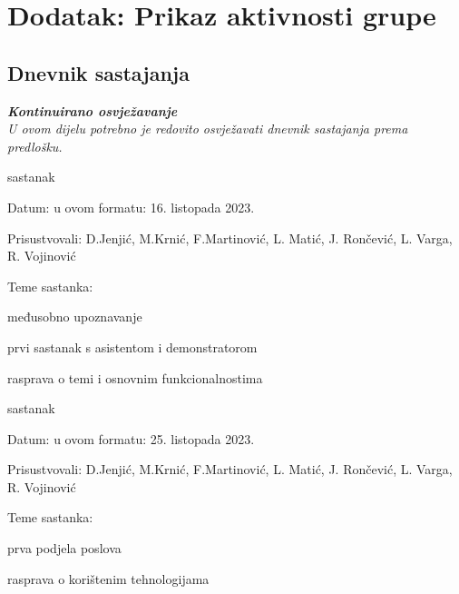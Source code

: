 \chapter*{Dodatak: Prikaz aktivnosti grupe}
		
		\section*{Dnevnik sastajanja}
		
		\textbf{\textit{Kontinuirano osvježavanje}}\\
		
		 \textit{U ovom dijelu potrebno je redovito osvježavati dnevnik sastajanja prema predlošku.}
		
		\begin{packed_enum}
			\item  sastanak
			
			\item[] \begin{packed_item}
				\item Datum: u ovom formatu: 16. listopada 2023.
				\item Prisustvovali: D.Jenjić, M.Krnić, F.Martinović, L. Matić, J. Rončević, L. Varga, R. Vojinović
				\item Teme sastanka:
				\begin{packed_item}
					\item  međusobno upoznavanje
					\item  prvi sastanak s asistentom i demonstratorom
					\item  rasprava o temi i osnovnim funkcionalnostima 
				\end{packed_item}
			\end{packed_item}
		
			
			\item  sastanak
			\item[] \begin{packed_item}
				\item Datum: u ovom formatu: 25. listopada 2023.
				\item Prisustvovali:  D.Jenjić, M.Krnić, F.Martinović, L. Matić, J. Rončević, L. Varga, R. Vojinović
				\item Teme sastanka:
				\begin{packed_item}
					\item  prva podjela poslova
					\item  rasprava o korištenim tehnologijama
				\end{packed_item}
			\end{packed_item}
			

\end{packed_enum}
